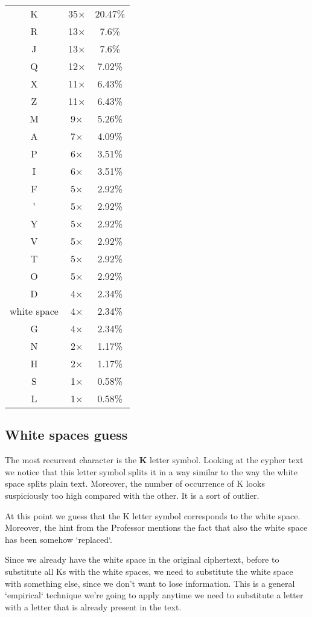 \documentclass{article}
\begin{document}
\begin{tabular}{ c c c }
	K &	35× & 20.47\% \\
	R &	13× & 7.6\% \\
	J &	13× & 7.6\% \\
	Q &	12× & 7.02\%	\\
	X &	11× & 6.43\%	\\
	Z &	11× & 6.43\%	\\
	M &	9× & 5.26\% \\
	A &	7× & 4.09\% \\
	P &	6× & 3.51\% \\
	I &	6× & 3.51\% \\
	F &	5× & 2.92\% \\
	' &	5× & 2.92\% \\
	Y &	5× & 2.92\% \\
	V &	5× & 2.92\% \\
	T &	5× & 2.92\% \\
	O &	5× & 2.92\% \\
	D &	4× & 2.34\% \\
	white space &	4× & 2.34\% \\
	G &	4× & 2.34\% \\
	N &	2× & 1.17\% \\
	H &	2× & 1.17\% \\
	S &	1× & 0.58\% \\
	L &	1× & 0.58\% \\
\end{tabular}

\subsection{White spaces guess}

The most recurrent character is the \textbf{K} letter symbol.
Looking at the cypher text we notice that this letter symbol splits it in a way similar to the way the white space splits plain text.
Moreover, the number of occurrence of K looks suspiciously too high compared with the other. It is a sort of outlier.

At this point we guess that the K letter symbol corresponds to the white space.
Moreover, the hint from the Professor mentions the fact that also the white space has been somehow `replaced`.

Since we already have the white space in the original ciphertext, before to substitute all Ks with the white spaces, we need to substitute the white space with something else, since we don't want to lose information. This is a general `empirical` technique we're going to apply anytime we need to substitute a letter with a letter that is already present in the text.
\end{document}
